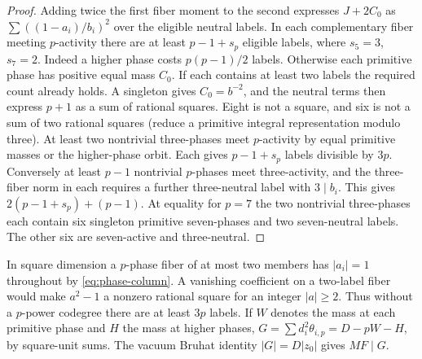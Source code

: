 \documentclass[11pt]{amsart}
\numberwithin{equation}{section}
\theoremstyle{definition}
\theoremstyle{plain}
\begin{document}
\begin{proof}
Adding twice the first fiber moment to the second expresses $J+2C_0$
as $\sum((1-a_i)/b_i)^2$ over the eligible neutral labels.
In each complementary fiber meeting $p$-activity there are at least $p-1+s_p$ eligible
labels, where $s_5=3$, $s_7=2$. Indeed a higher phase costs
$p(p-1)/2$ labels. Otherwise each primitive phase has positive equal
mass $C_0$. If each contains at least two labels the required count
already holds. A singleton gives $C_0=b^{-2}$, and the neutral
terms then express $p+1$ as a sum of rational squares. Eight is
not a square, and six is not a sum of two rational squares
(reduce a primitive integral representation modulo three).
At least two nontrivial three-phases meet $p$-activity by equal
primitive masses or the higher-phase orbit. Each gives $p-1+s_p$
labels divisible by $3p$. Conversely at least $p-1$ nontrivial
$p$-phases meet three-activity, and the three-fiber norm in each
requires a further three-neutral label with $3\mid b_i$. This gives
$2(p-1+s_p)+(p-1)$. At equality for $p=7$ the two nontrivial
three-phases each contain six singleton primitive seven-phases and
two seven-neutral labels. The other six are seven-active and three-neutral.
\end{proof}
In square dimension a $p$-phase fiber of at most two
members has $|a_i|=1$ throughout by \eqref{eq:phase-column}.
A vanishing coefficient on a two-label fiber would make $a^2-1$
a nonzero rational square for an integer $|a|\ge2$. Thus without
a $p$-power codegree there are at least $3p$ labels. If $W$ denotes
the mass at each primitive phase and $H$ the mass at higher phases,
$G=\sum d_i^2\theta_{i,p}=D-pW-H$, by square-unit sums.
The vacuum Bruhat identity $|G|=D|z_0|$ gives $MF\mid G$.
\end{document}
